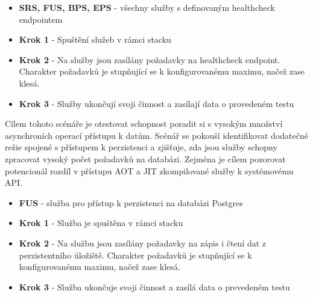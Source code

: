 

\begin{itemize}
    \item \textbf{SRS, FUS, BPS, EPS} - všechny služby s definovaným healthcheck endpointem
\end{itemize}


\begin{itemize}
    \item \textbf{Krok 1} - Spuštění služeb v rámci stacku
    \item \textbf{Krok 2} - Na služby jsou zasílány požadavky na healthcheck endpoint. Charakter požadavků je stupňující se k konfigurovanému maximu, načež zase klesá.
    \item \textbf{Krok 3} - Služby ukončují svoji činnost a zasílají data o provedeném testu
\end{itemize}


Cílem tohoto scénáře je otestovat schopnost poradit si s vysokým množství asynchroních operací přístupu k datům. Scénář se pokouší identifikovat dodatečné režie spojené s přístupem k perzistenci a zjišťuje, zda jsou služby schopny zpracovat vysoký počet požadavků na databázi. Zejména je cílem pozorovat potencionál rozdíl v přístupu AOT a JIT zkompilované služby k systémovému API.



\begin{itemize}
    \item \textbf{FUS} - služba pro přístup k perzistenci na databázi Postgres
\end{itemize}


\begin{itemize}
    \item \textbf{Krok 1} - Služba je spuštěna v rámci stacku
    \item \textbf{Krok 2} - Na službu jsou zasílány požadavky na zápis i čtení dat z perzistentního úložiště. Charakter požadavků je stupňující se k konfigurovanému maximu, načež zase klesá.
    \item \textbf{Krok 3} - Služba ukončuje svoji činnost a zasílá data o prevedeném testu
\end{itemize}

